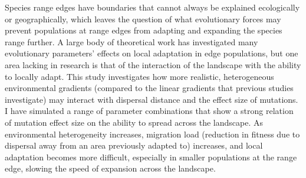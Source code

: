 	
	Species range edges have boundaries that cannot always be explained ecologically or geographically, which leaves the question of what evolutionary forces may prevent populations at range edges from adapting and expanding the species range further. A large body of theoretical work has investigated many evolutionary parameters' effects on local adaptation in edge populations, but one area lacking in research is that of the interaction of the landscape with the ability to locally adapt. This study investigates how more realistic, heterogeneous environmental gradients (compared to the linear gradients that previous studies investigate) may interact with dispersal distance and the effect size of mutations. I have simulated a range of parameter combinations that show a strong relation of mutation effect size on the ability to spread across the landscape. As environmental heterogeneity increases, migration load (reduction in fitness due to dispersal away from an area previously adapted to) increases, and local adaptation becomes more difficult, especially in smaller populations at the range edge, slowing the speed of expansion across the landscape.
	
